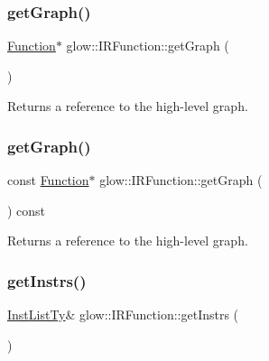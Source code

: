 \subsubsection{\texorpdfstring{get\+Graph()}{getGraph()}\hspace{0.1cm}{\footnotesize\ttfamily [1/2]}}
{\footnotesize\ttfamily \hyperlink{classglow_1_1_function}{Function}$\ast$ glow\+::\+I\+R\+Function\+::get\+Graph (\begin{DoxyParamCaption}{ }\end{DoxyParamCaption})\hspace{0.3cm}{\ttfamily [inline]}}

\begin{DoxyReturn}{Returns}
a reference to the high-\/level graph. 
\end{DoxyReturn}
\mbox{\label{classglow_1_1_i_r_function_ad86f50fe3418ea5acd411afeda573dae}} 
\subsubsection{\texorpdfstring{get\+Graph()}{getGraph()}\hspace{0.1cm}{\footnotesize\ttfamily [2/2]}}
{\footnotesize\ttfamily const \hyperlink{classglow_1_1_function}{Function}$\ast$ glow\+::\+I\+R\+Function\+::get\+Graph (\begin{DoxyParamCaption}{ }\end{DoxyParamCaption}) const\hspace{0.3cm}{\ttfamily [inline]}}

\begin{DoxyReturn}{Returns}
a reference to the high-\/level graph. 
\end{DoxyReturn}
\mbox{\label{classglow_1_1_i_r_function_a79a1864f27ee4ae0289e2ede9876ea88}} 
\subsubsection{\texorpdfstring{get\+Instrs()}{getInstrs()}\hspace{0.1cm}{\footnotesize\ttfamily [1/2]}}
{\footnotesize\ttfamily \hyperlink{classglow_1_1_tagged_list}{Inst\+List\+Ty}\& glow\+::\+I\+R\+Function\+::get\+Instrs (\begin{DoxyParamCaption}{ }\end{DoxyParamCaption})\hspace{0.3cm}{\ttfamily [inline]}}

